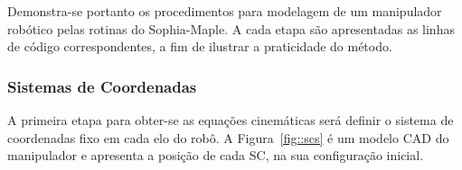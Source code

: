 Demonstra-se portanto os procedimentos para modelagem de um manipulador robótico
pelas rotinas do Sophia-Maple. A cada etapa são apresentadas as linhas de código
correspondentes, a fim de ilustrar a praticidade do método.

\subsubsection{Sistemas de Coordenadas}

A primeira etapa para obter-se as equações cinemáticas será definir o sistema de
coordenadas fixo em cada elo do robô. A Figura~\ref{fig::scs} é um modelo CAD do
manipulador e apresenta a posição de cada SC, na sua configuração inicial.

\begin{figure}[h]
    \centering
    \begin{subfigure}[b]{0.20\textwidth}

\end{subfigure}
\end{figure}
